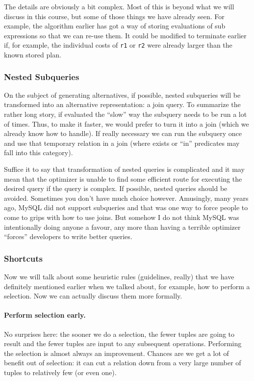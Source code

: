 \documentclass[a4paper]{report}
\begin{document}
The details are obviously a bit complex. Most of this is beyond what we will discuss in this course, but some of those things we have already seen. For example, the algorithm earlier has got a way of storing evaluations of sub expressions so that we can re-use them. It could be modified to terminate earlier if, for example, the individual costs of \texttt{r1} or \texttt{r2} were already larger than the known stored plan.

\subsubsection*{Nested Subqueries}

On the subject of generating alternatives, if possible, nested subqueries will be transformed into an alternative representation: a join query. To summarize the rather long story, if evaluated the ``slow'' way the subquery needs to be run a lot of times. Thus, to make it faster, we would prefer to turn it into a join (which we already know how to handle). If really necessary we can run the subquery once and use that temporary relation in a join (where exists or ``in'' predicates may fall into this category).

Suffice it to say that transformation of nested queries is complicated and it may mean that the optimizer is unable to find some efficient route for executing the desired query if the query is complex. If possible, nested queries should be avoided. Sometimes you don't have much choice however. Amusingly, many years ago, MySQL did not support subqueries and that was one way to force people to come to grips with how to use joins. But somehow I do not think MySQL was intentionally doing anyone a favour, any more than having a terrible optimizer ``forces'' developers to write better queries. 


\subsubsection*{Shortcuts}

Now we will talk about some heuristic rules (guidelines, really) that we have definitely mentioned earlier when we talked about, for example, how to perform a selection. Now we can actually discuss them more formally.

\paragraph{Perform selection early.} No surprises here: the sooner we do a selection, the fewer tuples are going to result and the fewer tuples are input to any subsequent operations. Performing the selection is almost always an improvement. Chances are we get a lot of benefit out of selection: it can cut a relation down from a very large number of tuples to relatively few (or even one). 
\end{document}
